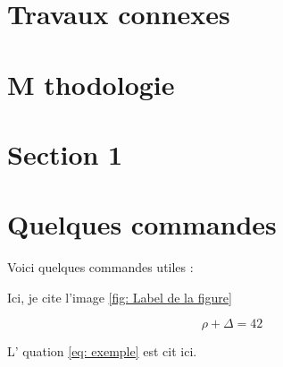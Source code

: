 \documentclass{article}
\begin{document}
\newpage

\section{Travaux connexes}
\lipsum[1-2] 





\newpage

\section{M thodologie}
\lipsum[2-3]





\newpage

\section{Section 1}




\section{Quelques commandes}

Voici quelques commandes utiles :



Ici, je cite l'image \ref{fig: Label de la figure}



\begin{equation} \label{eq: exemple}
\rho + \Delta = 42
\end{equation}

L' quation \ref{eq: exemple} est cit  ici.
\end{document}
